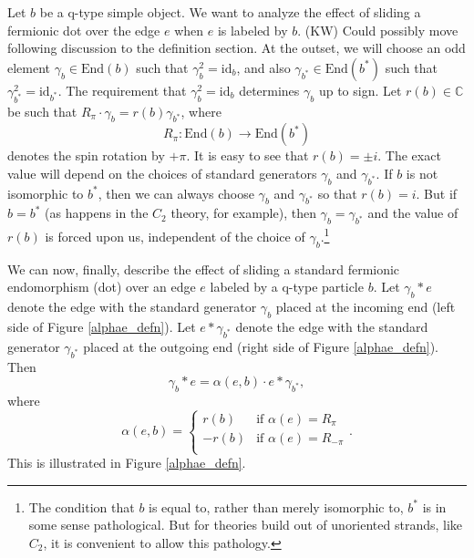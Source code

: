 \documentclass[12pt,a4paper]{article}
\newcommand{\cc}{\mathbb{C}}
\newcommand\be            {\begin{equation}}
\newcommand\ee            {\end{equation}}
\newcommand{\id}{\text{id}}
\newcommand{\End}{\text{End}}
\newcommand{\kw}[1]{{\color{kwcolor}\footnotesize{(KW) #1}}}
\begin{document}
Let $b$ be a q-type simple object.
We want to analyze the effect of sliding a fermionic dot over the edge $e$ when $e$ is labeled by $b$.
\kw{Could possibly move following discussion to the definition section.}
At the outset, we will choose an odd element $\gamma_b\in\End(b)$ such that $\gamma_b^2 = \id_b$, and also
$\gamma_{b^*}\in\End(b^*)$ such that $\gamma_{b^*}^2 = \id_{b^*}$.
The requirement that $\gamma_b^2 = \id_b$ determines $\gamma_b$ up to sign.
Let $r(b)\in\cc$ be such that $R_\pi\cdot\gamma_b = r(b)\gamma_{b^*}$, where
\be
	R_\pi : \End(b) \to \End(b^*)
\ee
denotes the spin rotation by $+\pi$.
It is easy to see that $r(b) = \pm i$.
The exact value will depend on the choices of standard generators $\gamma_b$ and $\gamma_{b^*}$.
If $b$ is not isomorphic to $b^*$, then we can always choose $\gamma_b$ and $\gamma_{b^*}$ so that $r(b) = i$.
But if $b = b^*$ (as happens in the $C_2$ theory, for example), then $\gamma_b = \gamma_{b^*}$ and the value of $r(b)$
is forced upon us, independent of the choice of $\gamma_b$.\footnote{
The condition that $b$ is equal to, rather than merely isomorphic to, $b^*$ is in some sense pathological.
But for theories build out of unoriented strands, like $C_2$, it is convenient to allow this pathology.}

We can now, finally, describe the effect of sliding a standard fermionic endomorphism (dot) over an edge $e$ labeled by 
a q-type particle $b$.
Let $\gamma_b * e$ denote the edge with the standard generator $\gamma_b$ placed at the incoming end (left side of Figure \ref{alphae_defn}).
Let $e* \gamma_{b^*}$ denote the edge with the standard generator $\gamma_{b^*}$ placed at the outgoing end (right side of Figure \ref{alphae_defn}).
Then
\be
	\gamma_b * e = \alpha(e, b) \cdot e* \gamma_{b^*} ,
\ee
where
\be
	\alpha(e, b) =  \left\{   \begin{array}{ll}  
		r(b) & \mbox{if $\alpha(e) = R_\pi$} \\
		-r(b) & \mbox{if $\alpha(e) = R_{-\pi}$} \\
	\end{array}  \right. .
\ee
This is illustrated in Figure \ref{alphae_defn}.

\end{document}
